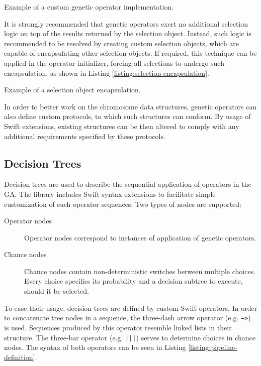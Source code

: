 \todo %

\begin{listing}[ht]
	\caption{Example of a custom genetic operator implementation.}
	\label{listing:custom-operator}
\end{listing}

It is strongly recommended that genetic operators exert no additional selection logic on top of the results returned by the selection object. Instead, such logic is recommended to be resolved by creating custom selection objects, which are capable of encapsulating other selection objects. If required, this technique can be applied in the operator initializer, forcing all selections to undergo such encapsulation, as shown in Listing \ref{listing:selection-encapsulation}.

\begin{listing}[ht]
	\caption{Example of a selection object encapsulation.}
	\label{listing:selection-encapsulation}
\end{listing}

In order to better work on the chromosome data structures, genetic operators can also define custom protocols, to which such structures can conform. By usage of Swift extensions, existing structures can be then altered to comply with any additional requirements specified by these protocols.

\subsection{Decision Trees}\label{section:decision-trees}
Decision trees are used to describe the sequential application of operators in the GA. The library includes Swift syntax extensions to facilitate simple customization of such operator sequences. Two types of nodes are supported:
~
\begin{description}
	\item[Operator nodes]
	Operator nodes correspond to instances of application of genetic operators.

	\item[Chance nodes]
	Chance nodes contain non-deterministic switches between multiple choices. Every choice specifies its probability and a decision subtree to execute, should it be selected.
\end{description}

To ease their usage, decision trees are defined by custom Swift operators. In order to concatenate tree nodes in a sequence, the three-dash arrow operator (e.g. \texttt{--->}) is used. Sequences produced by this operator resemble linked lists in their structure. The three-bar operator (e.g. \texttt{|||}) serves to determine choices in chance nodes. The syntax of both operators can be seen in Listing \ref{listing:pipeline-definition}.

